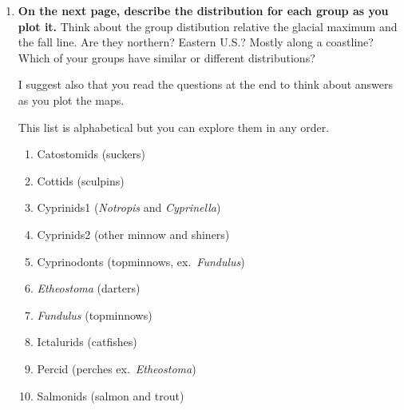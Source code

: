 \documentclass[11pt]{article}
\begin{document}
\begin{enumerate}[resume]
\item \textbf{On the next page, describe the distribution for each group as you plot it.} Think about the group distibution relative the glacial maximum and the fall line. Are they northern? Eastern U.S.?
Mostly along a coastline? Which of your groups have similar or  different distributions? 

I suggest also that you read the questions at the end to think about answers as you plot the maps. \vspace{\baselineskip}


\newpage

This list is alphabetical but you can explore them in any order.

	\begin{enumerate}[label=\alph*., leftmargin=*]

		\item Catostomids (suckers)\vspace{3\baselineskip}

		\item Cottids (sculpins)\vspace{3\baselineskip}

		\item Cyprinids1 (\textit{Notropis} and \textit{Cyprinella})\vspace{3\baselineskip}

		\item Cyprinids2 (other minnow and shiners)\vspace{3\baselineskip}

		\item Cyprinodonts (topminnows, ex.~\textit{Fundulus})\vspace{3\baselineskip}

		\item \textit{Etheostoma} (darters)\vspace{3\baselineskip}

		\item \textit{Fundulus} (topminnows)\vspace{3\baselineskip}

		\item Ictalurids (catfishes)\vspace{3\baselineskip}

		\item Percid (perches ex.~\textit{Etheostoma})\vspace{3\baselineskip}

		\item Salmonids (salmon and trout)\vspace{3\baselineskip}
	\end{enumerate}
\end{enumerate}
\end{document}
